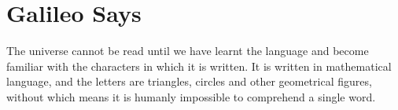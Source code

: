 \section{Galileo Says}

The universe cannot be read until we have learnt the language and become 
familiar with the characters in which it is written. It is written in mathematical language,
and the letters are triangles, circles and other geometrical figures, without which means it 
is humanly impossible to comprehend a single word.